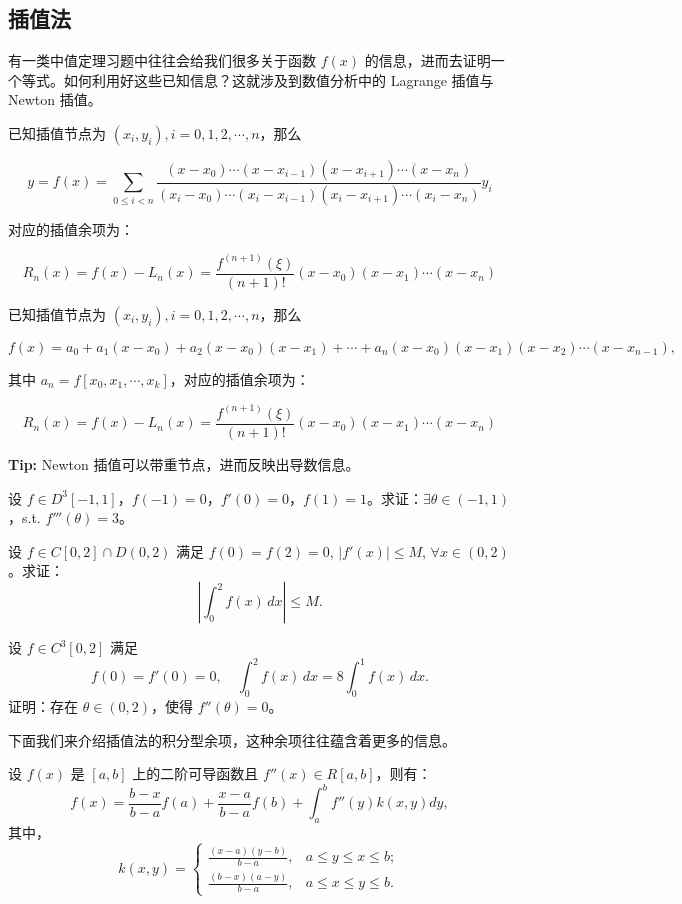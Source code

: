 \documentclass[lang=cn,10pt,thmcnt=section]{elegantbook}
\begin{document}
\subsection{插值法}
有一类中值定理习题中往往会给我们很多关于函数 $f(x)$ 的信息，进而去证明一个等式。如何利用好这些已知信息？这就涉及到数值分析中的 Lagrange 插值与 Newton 插值。
\begin{theorem}[Lagrange 插值]
	已知插值节点为 $(x_i, y_i), i = 0, 1, 2, \cdots, n$，那么

\[ y = f(x) = \sum_{0 \leq i < n} \frac{(x - x_0) \cdots (x - x_{i-1})(x - x_{i+1}) \cdots (x - x_n)}{(x_i - x_0) \cdots (x_i - x_{i-1})(x_i - x_{i+1}) \cdots (x_i - x_n)} y_i \]

对应的插值余项为：

\[ R_n(x) = f(x) - L_n(x) = \frac{f^{(n+1)}(\xi)}{(n+1)!}(x - x_0)(x - x_1) \cdots (x - x_n) \]

\end{theorem}
\begin{theorem}[Newton 插值]
	已知插值节点为 $(x_i, y_i), i = 0, 1, 2, \cdots, n$，那么

\[ f(x) = a_0 + a_1(x - x_0) + a_2(x - x_0)(x - x_1) + \cdots + a_n(x - x_0)(x - x_1)(x - x_2) \cdots (x - x_{n-1}), \]

其中 $a_n = f[x_0, x_1, \cdots, x_k]$，对应的插值余项为：

\[ R_n(x) = f(x) - L_n(x) = \frac{f^{(n+1)}(\xi)}{(n+1)!}(x - x_0)(x - x_1) \cdots (x - x_n) \]

\textbf{Tip:} Newton 插值可以带重节点，进而反映出导数信息。
\end{theorem}
\begin{example}
	设 $f \in D^3[-1, 1]$，$f(-1) = 0$，$f'(0) = 0$，$f(1) = 1$。求证：$\exists \theta \in (-1, 1)$，s.t. $f'''(\theta) = 3$。
\end{example}
\begin{example}
	设 \(f \in C[0, 2] \cap D(0, 2)\) 满足 \(f(0) = f(2) = 0\), \(|f'(x)| \leq M\), \(\forall x \in (0, 2)\)。求证：
\[ \left| \int_{0}^{2} f(x) \, dx \right| \leq M. \]
\end{example}
\begin{example}
	设 \( f \in C^3[0,2] \) 满足
\[ f(0) = f'(0) = 0, \quad \int_{0}^{2} f(x) \, dx = 8 \int_{0}^{1} f(x) \, dx. \]
证明：存在 \( \theta \in (0,2) \)，使得 \( f''(\theta) = 0 \)。
\end{example}
下面我们来介绍插值法的积分型余项，这种余项往往蕴含着更多的信息。
\begin{theorem}[积分型余项]
	设 \( f(x) \) 是 \([a,b]\) 上的二阶可导函数且 \( f''(x) \in R[a,b] \)，则有：
\[ f(x) = \frac{b-x}{b-a}f(a) + \frac{x-a}{b-a}f(b) + \int_a^b f''(y)k(x,y)dy, \]
其中，
\[ k(x,y) = 
\begin{cases} 
\frac{(x-a)(y-b)}{b-a}, & a \leq y \leq x \leq b; \\ 
\frac{(b-x)(a-y)}{b-a}, & a \leq x \leq y \leq b.
\end{cases} \]
\end{theorem}
\end{document}

